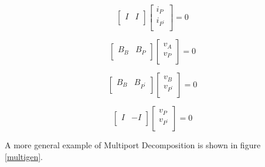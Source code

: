 \documentclass[12pt,psfig,a4]{article}
\begin{document}
\begin{equation}
\left[\begin{array}{ll}
I & I\\
\end{array}\right]
\left[\begin{array}{l}
i_{P} \\
i_{P^{'}}\\
\end{array}\right]
= 0
\end{equation}

\begin{equation}
\left[\begin{array}{ll}
B_{B} & B_{P}\\
\end{array}\right]
\left[\begin{array}{l}
v_{A} \\
v_{P}\\
\end{array}\right]
= 0
\end{equation}

\begin{equation}
\left[\begin{array}{ll}
B_{B} & B_{P^{'}}\\
\end{array}\right]
\left[\begin{array}{l}
v_{B} \\
v_{P^{'}}\\
\end{array}\right]
= 0
\end{equation}

\begin{equation}
\left[\begin{array}{ll}
I & -I\\
\end{array}\right]
\left[\begin{array}{l}
v_{P} \\
v_{P^{'}}\\
\end{array}\right]
= 0
\end{equation}

A more general example of Multiport Decomposition is shown in figure \ref{multigen}.
\end{document}
